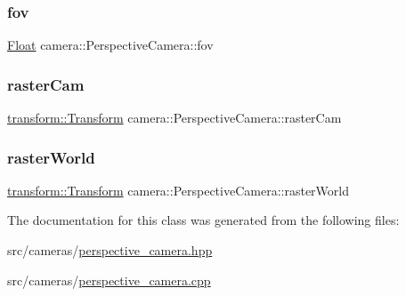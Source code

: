 \subsubsection{\texorpdfstring{fov}{fov}}
{\footnotesize\ttfamily \mbox{\hyperlink{cyclop_8hpp_a07afd7094cb489cbd514c76e6f55d34f}{Float}} camera\+::\+Perspective\+Camera\+::fov}

\mbox{\label{classcamera_1_1PerspectiveCamera_a83c1c62b9973b5d80760cbee833333c1}} 
\subsubsection{\texorpdfstring{rasterCam}{rasterCam}}
{\footnotesize\ttfamily \mbox{\hyperlink{classtransform_1_1Transform}{transform\+::\+Transform}} camera\+::\+Perspective\+Camera\+::raster\+Cam}

\mbox{\label{classcamera_1_1PerspectiveCamera_aedff86de2d3ce5edef545baad2797b0f}} 
\subsubsection{\texorpdfstring{rasterWorld}{rasterWorld}}
{\footnotesize\ttfamily \mbox{\hyperlink{classtransform_1_1Transform}{transform\+::\+Transform}} camera\+::\+Perspective\+Camera\+::raster\+World}



The documentation for this class was generated from the following files\+:\begin{DoxyCompactItemize}
\item 
src/cameras/\mbox{\hyperlink{perspective__camera_8hpp}{perspective\+\_\+camera.\+hpp}}\item 
src/cameras/\mbox{\hyperlink{perspective__camera_8cpp}{perspective\+\_\+camera.\+cpp}}\end{DoxyCompactItemize}
